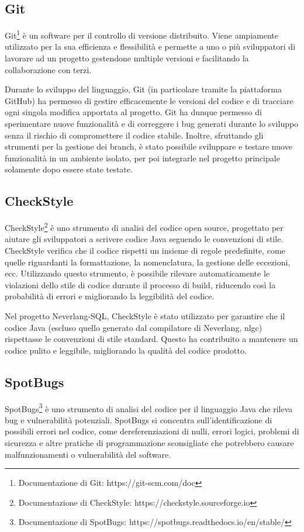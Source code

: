 \documentclass[12pt,a4paper,openright,twoside]{book}
\begin{document}
\subsection{Git}
Git\footnote{Documentazione di Git: https://git-scm.com/doc} è un software per il controllo di versione distribuito. Viene ampiamente 
utilizzato per la sua efficienza e flessibilità e permette a uno o più sviluppatori di lavorare ad un progetto gestendone multiple versioni e 
facilitando la collaborazione con terzi.

Durante lo sviluppo del linguaggio, Git (in particolare tramite la piattaforma GitHub) ha permesso di gestire efficacemente le versioni del 
codice e di tracciare ogni singola modifica apportata al progetto. Git ha dunque permesso di sperimentare nuove funzionalità e di correggere 
i bug generati durante lo sviluppo senza il rischio di compromettere il codice stabile. Inoltre, sfruttando gli strumenti per la gestione dei 
branch, è stato possibile sviluppare e testare nuove funzionalità in un ambiente isolato, per poi integrarle nel progetto principale solamente 
dopo essere state testate.

\subsection{CheckStyle}
CheckStyle\footnote{Documentazione di CheckStyle: https://checkstyle.sourceforge.io} è uno strumento di analisi del codice open source, 
progettato per aiutare gli sviluppatori a scrivere codice Java seguendo le convenzioni di stile. CheckStyle verifica che il codice rispetti 
un insieme di regole predefinite, come quelle riguardanti la formattazione, la nomenclatura, la gestione delle eccezioni, ecc. Utilizzando 
questo strumento, è possibile rilevare automaticamente le violazioni dello stile di codice durante il processo di build, riducendo così la 
probabilità di errori e migliorando la leggibilità del codice.

Nel progetto Neverlang-SQL, CheckStyle è stato utilizzato per garantire che il codice Java (escluso quello generato dal compilatore di 
Neverlang, nlgc) rispettasse le convenzioni di stile standard. Questo ha contribuito a mantenere un codice pulito e leggibile, migliorando 
la qualità del codice prodotto.

\subsection{SpotBugs}
SpotBugs\footnote{Documentazione di SpotBugs: https://spotbugs.readthedocs.io/en/stable/} è uno strumento di analisi del codice per il 
linguaggio Java che rileva bug e vulnerabilità potenziali. SpotBugs si concentra sull’identificazione di possibili errori nel codice, come 
dereferenziazioni di nulli, errori logici, problemi di sicurezza e altre pratiche di programmazione sconsigliate che potrebbero causare 
malfunzionamenti o vulnerabilità del software.
\end{document}
